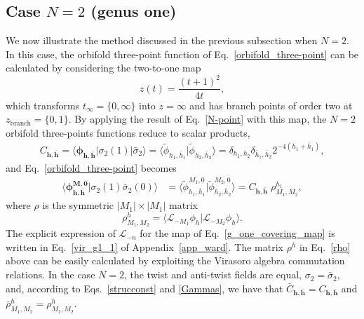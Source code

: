 \documentclass[a4paper,11pt]{article}
\begin{document}
\subsection{Case $N=2$ (genus one)}\label{sec:genus_one}

We now illustrate the method discussed in the previous subsection when $N=2$. 
In this case, the orbifold three-point function of Eq.~\eqref{orbifold_three-point} 
can be calculated by considering the two-to-one map
\begin{equation}\label{g_one_covering_map}
 z(t)=\frac{(t+1)^2}{4t},
\end{equation}
which transforms $t_{\infty}=\{0,\infty\}$ into $z=\infty$ and has branch points of 
order two at $z_{\text{branch}}=\{0, 1\}$. By applying the result of Eq.~\eqref{N-point} 
with this map, the $N=2$ orbifold three-points functions reduce to scalar products,
\begin{align}
 C_{\boldsymbol{h},\boldsymbol{\bar{h}}}=
 \langle\boldsymbol{\phi}_{\boldsymbol{h}, \boldsymbol{\bar{h}}}| 
 \sigma_{2}(1)|\bar{\sigma}_{2}\rangle
 =\langle \tilde{\phi}_{h_1,\bar{h}_1}|\tilde{\phi}_{h_2,\bar{h}_2}\rangle
 =\delta_{h_1, h_2}\delta_{\bar{h}_1,\bar{h}_2}2^{-4(h_1+\bar{h}_1)},
\end{align}
and Eq.~\eqref{orbifold_three-point} becomes
\begin{align}\label{C_2_X}
 \langle \boldsymbol{\phi}^{\boldsymbol{M},\boldsymbol{0}}_{\boldsymbol{h}, \boldsymbol{\bar{h}}}| 
 \sigma_{2}(1)\bar{\sigma}_{2}(0)\rangle&=\langle \tilde{\phi}_{h_1, \bar{h}_1}^{M_1,0} | \tilde{\phi}_{h_2, \bar{h}_2}^{M_2, 0}\rangle
 =C_{\boldsymbol{h}, \boldsymbol{\bar{h}}} \;\rho^{h_1}_{M_1,M_2},
\end{align}
where $\rho$ is the symmetric $|M_1|\times|M_1|$ matrix
\begin{equation}
\label{rho}
 \rho^h_{M_1,M_2}=\langle \mathcal{L}_{-M_1}\phi_{h}|\mathcal{L}_{-M_2}\phi_{h}\rangle.
\end{equation}
The explicit expression of $\mathcal{L}_{-n}$ for the map of Eq.~\eqref{g_one_covering_map}
is written in Eq.~\eqref{vir_g1_1} of Appendix~\ref{app_ward}. The matrix $\rho^h$ in Eq.~\eqref{rho} 
above can be easily calculated by exploiting the Virasoro algebra commutation relations. 
In the case $N=2$, the twist and anti-twist fields are equal, $\sigma_2=\bar{\sigma}_2$, and, 
according to Eqs.~\eqref{strucconst} and \eqref{Gammas}, we have that $\bar{C}_{\boldsymbol{h}, \boldsymbol{\bar{h}}}=C_{\boldsymbol{h}, \boldsymbol{\bar{h}}}$ and $\bar{\rho}_{M_1, M_2}^h=\rho_{M_1, M_2}^h$.
\end{document}
